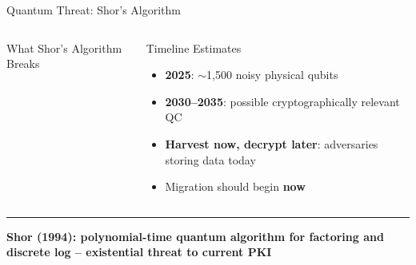 \documentclass[8pt,aspectratio=169]{beamer}
\newcommand{\bottomnote}[1]{\vfill\vspace{-2mm}\textcolor{mllavender2}{\rule{\textwidth}{0.4pt}}\vspace{1mm}\footnotesize\textbf{#1}}
\begin{document}
\begin{frame}{Quantum Threat: Shor's Algorithm}
\begin{columns}
\begin{block}{What Shor's Algorithm Breaks}
\begin{itemize}
\end{itemize}
\end{block}
\begin{block}{Timeline Estimates}
\begin{itemize}\small
  \item \textbf{2025}: $\sim$1{,}500 noisy physical qubits
  \item \textbf{2030--2035}: possible cryptographically relevant QC
  \item \textbf{Harvest now, decrypt later}: adversaries storing data today
  \item Migration should begin \textbf{now}
\end{itemize}
\end{block}
\end{columns}
\bottomnote{Shor (1994): polynomial-time quantum algorithm for factoring and discrete log -- existential threat to current PKI}
\end{frame}
\end{document}
